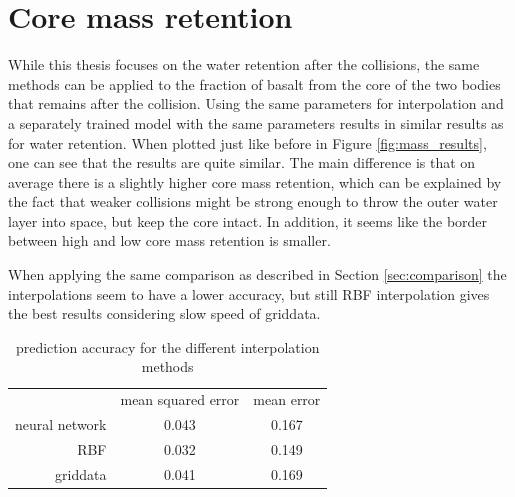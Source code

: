 \chapter{Core mass retention}

While this thesis focuses on the water retention after the collisions, the same methods can be applied to the fraction of basalt from the core of the two bodies that remains after the collision. Using the same parameters for interpolation and a separately trained model with the same parameters results in similar results as for water retention. When plotted just like before in Figure \ref{fig:mass_results}, one can see that the results are quite similar. The main difference is that on average there is a slightly higher core mass retention, which can be explained by the fact that weaker collisions might be strong enough to throw the outer water layer into space, but keep the core intact. In addition, it seems like the border between high and low core mass retention is smaller.

When applying the same comparison as described in Section \ref{sec:comparison} the interpolations seem to have a lower accuracy, but still RBF interpolation gives the best results considering slow speed of griddata.


\begin{table}[h]
	\centering
	\begin{tabular}{rcc}
		& {mean squared error} & {mean error} \\
		neural network &        0.043         &    0.167     \\
		RBF &        0.032         &    0.149     \\
		griddata &        0.041         &   0.169
	\end{tabular}
	\caption{prediction accuracy for the different interpolation methods}
	\label{tab:mass_comparison}
\end{table}

